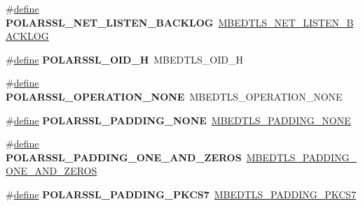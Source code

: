 \begin{DoxyCompactItemize}
\item 
\mbox{\label{compat-1_83_8h_adc2420949d7ec4d71bc892bcdb9d1875}} 
\#\hyperlink{structdefine}{define} {\bfseries P\+O\+L\+A\+R\+S\+S\+L\+\_\+\+N\+E\+T\+\_\+\+L\+I\+S\+T\+E\+N\+\_\+\+B\+A\+C\+K\+L\+OG}~\hyperlink{net__sockets_8h_a28c00c358ccc381ecfc2a28f59db8bd3}{M\+B\+E\+D\+T\+L\+S\+\_\+\+N\+E\+T\+\_\+\+L\+I\+S\+T\+E\+N\+\_\+\+B\+A\+C\+K\+L\+OG}
\item 
\mbox{\label{compat-1_83_8h_acaba14c9b04730cc71f41179e5099d35}} 
\#\hyperlink{structdefine}{define} {\bfseries P\+O\+L\+A\+R\+S\+S\+L\+\_\+\+O\+I\+D\+\_\+H}~M\+B\+E\+D\+T\+L\+S\+\_\+\+O\+I\+D\+\_\+H
\item 
\mbox{\label{compat-1_83_8h_a9b0b1760eb496e48d3b649b38f5f77ca}} 
\#\hyperlink{structdefine}{define} {\bfseries P\+O\+L\+A\+R\+S\+S\+L\+\_\+\+O\+P\+E\+R\+A\+T\+I\+O\+N\+\_\+\+N\+O\+NE}~M\+B\+E\+D\+T\+L\+S\+\_\+\+O\+P\+E\+R\+A\+T\+I\+O\+N\+\_\+\+N\+O\+NE
\item 
\mbox{\label{compat-1_83_8h_a4e675dcb69f894a928e3669d7f164ebe}} 
\#\hyperlink{structdefine}{define} {\bfseries P\+O\+L\+A\+R\+S\+S\+L\+\_\+\+P\+A\+D\+D\+I\+N\+G\+\_\+\+N\+O\+NE}~\hyperlink{cipher_8h_a5b57bc07ab7c430e9b4f29f3a5729837aace08abe82f9f79e57387133ceb07394}{M\+B\+E\+D\+T\+L\+S\+\_\+\+P\+A\+D\+D\+I\+N\+G\+\_\+\+N\+O\+NE}
\item 
\mbox{\label{compat-1_83_8h_aaf24b87fb7c01adad03b50c67c87796d}} 
\#\hyperlink{structdefine}{define} {\bfseries P\+O\+L\+A\+R\+S\+S\+L\+\_\+\+P\+A\+D\+D\+I\+N\+G\+\_\+\+O\+N\+E\+\_\+\+A\+N\+D\+\_\+\+Z\+E\+R\+OS}~\hyperlink{cipher_8h_a5b57bc07ab7c430e9b4f29f3a5729837a502732ab53a21eb0bf84e5a8e93609a7}{M\+B\+E\+D\+T\+L\+S\+\_\+\+P\+A\+D\+D\+I\+N\+G\+\_\+\+O\+N\+E\+\_\+\+A\+N\+D\+\_\+\+Z\+E\+R\+OS}
\item 
\mbox{\label{compat-1_83_8h_a588ea750553948386f2f34c7cc410343}} 
\#\hyperlink{structdefine}{define} {\bfseries P\+O\+L\+A\+R\+S\+S\+L\+\_\+\+P\+A\+D\+D\+I\+N\+G\+\_\+\+P\+K\+C\+S7}~\hyperlink{cipher_8h_a5b57bc07ab7c430e9b4f29f3a5729837a787071478fb192f36d4a085e010b28f9}{M\+B\+E\+D\+T\+L\+S\+\_\+\+P\+A\+D\+D\+I\+N\+G\+\_\+\+P\+K\+C\+S7}
\item 
\mbox{\label{compat-1_83_8h_a181b8bbd10cdb869f0798f5280a8a34a}} 

\end{DoxyCompactItemize}
